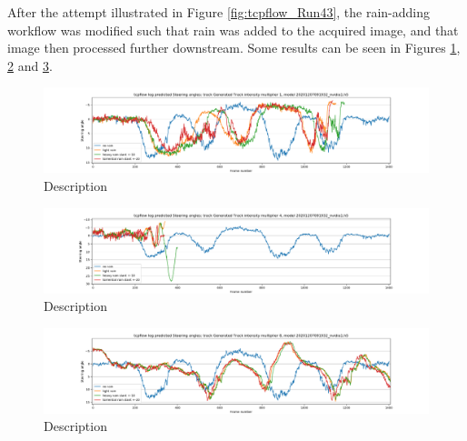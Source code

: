 After the attempt illustrated in Figure \ref{fig:tcpflow_Run43}, the rain-adding workflow was modified such that rain was added to the acquired image, and that image then processed further downstream. Some results can be seen in Figures
\ref{fig:sa_GeneratedTrackintensitymultiplier1_20201207091932_nvidia1}, \ref{fig:sa_GeneratedTrackintensitymultiplier4_20201207091932_nvidia1} and
\ref{fig:sa_GeneratedTrackintensitymultiplier8_20201207091932_nvidia1}.


\begin{figure}[ht]
 \centering 
 \includegraphics[width=\textwidth]{Figures/sa_GeneratedTrackintensitymultiplier1_20201207091932_nvidia1.h5.png}
 \caption{Description}
 \label{fig:sa_GeneratedTrackintensitymultiplier1_20201207091932_nvidia1} 
\end{figure}

\begin{figure}[ht]
 \centering 
 \includegraphics[width=\textwidth]{Figures/sa_GeneratedTrackintensitymultiplier4_20201207091932_nvidia1.h5.png}
 \caption{Description}
 \label{fig:sa_GeneratedTrackintensitymultiplier4_20201207091932_nvidia1} 
\end{figure}

\begin{figure}[ht]
 \centering 
 \includegraphics[width=\textwidth]{Figures/sa_GeneratedTrackintensitymultiplier8_20201207091932_nvidia1.h5.png}
 \caption{Description}
 \label{fig:sa_GeneratedTrackintensitymultiplier8_20201207091932_nvidia1} 
\end{figure}

